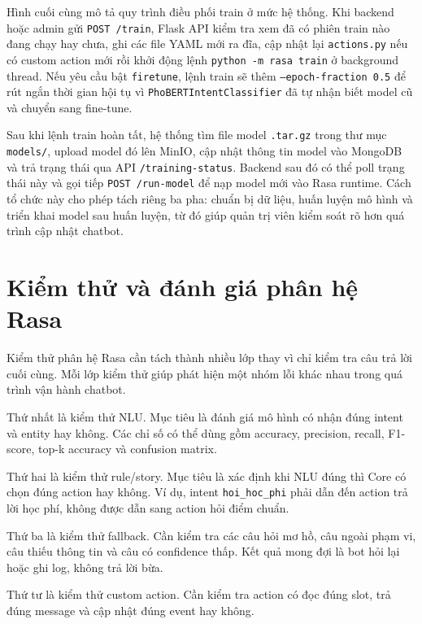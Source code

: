 \documentclass[12pt,a4paper]{report}
\begin{document}
Hình cuối cùng mô tả quy trình điều phối train ở mức hệ thống. Khi backend hoặc admin gửi \texttt{POST /train}, Flask API kiểm tra xem đã có phiên train nào đang chạy hay chưa, ghi các file YAML mới ra đĩa, cập nhật lại \texttt{actions.py} nếu có custom action mới rồi khởi động lệnh \texttt{python -m rasa train} ở background thread. Nếu yêu cầu bật \texttt{firetune}, lệnh train sẽ thêm \texttt{--epoch-fraction 0.5} để rút ngắn thời gian hội tụ vì \texttt{PhoBERTIntentClassifier} đã tự nhận biết model cũ và chuyển sang fine-tune.

Sau khi lệnh train hoàn tất, hệ thống tìm file model \texttt{.tar.gz} trong thư mục \texttt{models/}, upload model đó lên MinIO, cập nhật thông tin model vào MongoDB và trả trạng thái qua API \texttt{/training-status}. Backend sau đó có thể poll trạng thái này và gọi tiếp \texttt{POST /run-model} để nạp model mới vào Rasa runtime. Cách tổ chức này cho phép tách riêng ba pha: chuẩn bị dữ liệu, huấn luyện mô hình và triển khai model sau huấn luyện, từ đó giúp quản trị viên kiểm soát rõ hơn quá trình cập nhật chatbot.

\section{Kiểm thử và đánh giá phân hệ Rasa}

Kiểm thử phân hệ Rasa cần tách thành nhiều lớp thay vì chỉ kiểm tra câu trả lời cuối cùng. Mỗi lớp kiểm thử giúp phát hiện một nhóm lỗi khác nhau trong quá trình vận hành chatbot.

Thứ nhất là kiểm thử NLU. Mục tiêu là đánh giá mô hình có nhận đúng intent và entity hay không. Các chỉ số có thể dùng gồm accuracy, precision, recall, F1-score, top-k accuracy và confusion matrix.

Thứ hai là kiểm thử rule/story. Mục tiêu là xác định khi NLU đúng thì Core có chọn đúng action hay không. Ví dụ, intent \texttt{hoi\_hoc\_phi} phải dẫn đến action trả lời học phí, không được dẫn sang action hỏi điểm chuẩn.

Thứ ba là kiểm thử fallback. Cần kiểm tra các câu hỏi mơ hồ, câu ngoài phạm vi, câu thiếu thông tin và câu có confidence thấp. Kết quả mong đợi là bot hỏi lại hoặc ghi log, không trả lời bừa.

Thứ tư là kiểm thử custom action. Cần kiểm tra action có đọc đúng slot, trả đúng message và cập nhật đúng event hay không.
\end{document}
